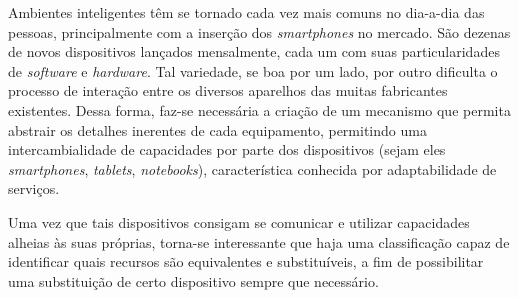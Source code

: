 Ambientes inteligentes têm se tornado cada vez mais comuns no dia-a-dia das pessoas, principalmente com a inserção dos \emph{smartphones} no mercado. São dezenas de novos dispositivos lançados mensalmente, cada um com suas particularidades de \emph{software} e \emph{hardware}. Tal variedade, se boa por um lado, por outro dificulta o processo de interação entre os diversos aparelhos das muitas fabricantes existentes. Dessa forma, faz-se necessária a criação de um mecanismo que permita abstrair os detalhes inerentes de cada equipamento, permitindo uma intercambialidade de capacidades por parte dos dispositivos (sejam eles \emph{smartphones}, \emph{tablets}, \emph{notebooks}), característica conhecida por adaptabilidade de serviços.

Uma vez que tais dispositivos consigam se comunicar e utilizar capacidades alheias às suas próprias, torna-se interessante que haja uma classificação capaz de identificar quais recursos são equivalentes e substituíveis, a fim de possibilitar uma substituição de certo dispositivo sempre que necessário.

